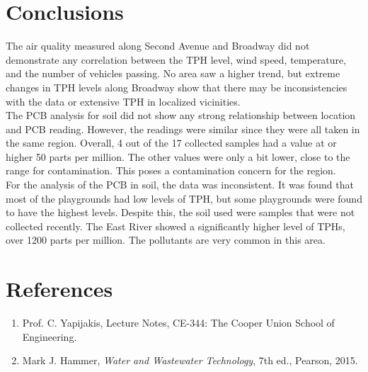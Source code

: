 \documentclass{article}
\begin{document}
    \section{Conclusions}
    \indent The air quality measured along Second Avenue and Broadway did not demonstrate any correlation between the TPH level, wind speed, temperature, and the number of vehicles passing. No area saw a higher trend, but extreme changes in TPH levels along Broadway show that there may be inconsistencies with the data or extensive TPH in localized vicinities.\\
    \indent The PCB analysis for soil did not show any strong relationship between location and PCB reading. However, the readings were similar since they were all taken in the same region. Overall, 4 out of the 17 collected samples had a value at or higher 50 parts per million. The other values were only a bit lower, close to the range for contamination. This poses a contamination concern for the region.\\
    \indent For the analysis of the PCB in soil, the data was inconsistent. It was found that most of the playgrounds had low levels of TPH, but some playgrounds were found to have the highest levels. Despite this, the soil used were samples that were not collected recently. The East River showed a significantly higher level of TPHs, over 1200 parts per million. The pollutants are very common in this area.\\
    \newpage
    \section{References}
    \begin{enumerate}
        \item Prof. C. Yapijakis, Lecture Notes, CE-344: The Cooper Union School of Engineering.
        \item Mark J. Hammer, \emph{Water and Wastewater Technology}, 7th ed., Pearson, 2015.
    \end{enumerate}
    \newpage    
\end{document}
